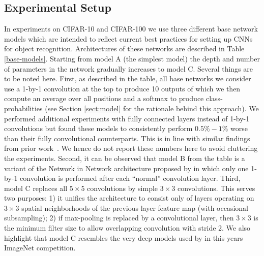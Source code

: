 \documentclass{article} %
\begin{document}
\subsection{Experimental Setup}
\label{sect:setup}
In experiments on CIFAR-10 and CIFAR-100 we use three different base network models which are intended to
reflect current best practices for setting up CNNs for object
recognition. 
Architectures of these networks are described in Table
\ref{base-models}. Starting from model A (the simplest model) the depth and
number of parameters in the network gradually increases to model C. 
Several things are to be noted here. First, as described in the table,
all base networks we consider use a 1-by-1 convolution at the top to
produce 10 outputs of which we then compute an average over all
positions and a softmax to produce class-probabilities (see Section
\ref{sect:model} for the rationale behind this approach). We performed
additional experiments with fully connected layers instead of 
1-by-1 convolutions but found these models to consistently perform
$ 0.5 \% - 1 \%$ worse than their fully convolutional counterparts. This
is in line with similar findings from prior work~\citep{Lin_2014}. We
hence do not report these numbers here to avoid cluttering the
experiments. Second, it can be observed that model B from the table is
a variant of the Network in Network architecture proposed by \citet{Lin_2014} in which only one 1-by-1 convolution is
performed after each ``normal'' convolution layer. Third, model C
replaces all $5 \times 5$ convolutions by simple $3 \times 3$
convolutions. This serves two purposes: 1) it unifies the
architecture to consist only of layers operating on $3 \times 3$ spatial
neighborhoods of the previous layer feature map (with occasional
subsampling); 2) if max-pooling is replaced by a
convolutional layer, then $3 \times 3$ is the minimum filter size to allow overlapping convolution with stride 2. 
We also highlight that model C resembles the very deep
models used by \citet{VGG_2014} in this years ImageNet
competition.
\end{document}
